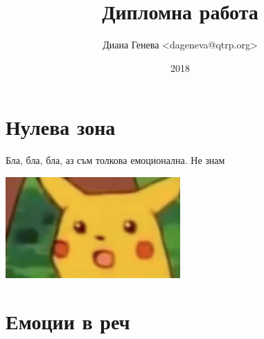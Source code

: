 \documentclass[12pt]{report}
\title{Дипломна работа}
\author{Диана Генева <dageneva@qtrp.org>}
\date{2018}
\begin{document}
\maketitle
\thispagestyle{empty}
\tableofcontents
\pagebreak

\chapter{Нулева зона}
Бла, бла, бла, аз съм толкова емоционална. 
Не знам

\includegraphics[width=0.5\textwidth ]{pikachu}

\chapter{Емоции в реч}
\end{document}
